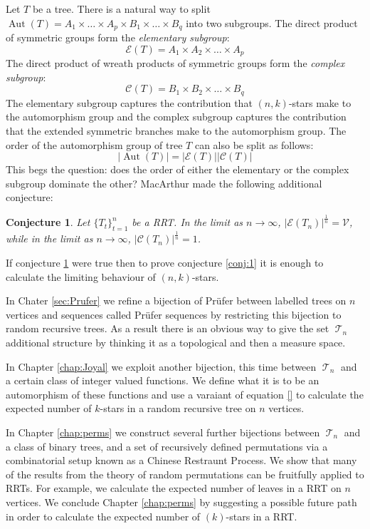 \documentclass[oneside]{book} %
\newtheorem{con}[thm]{Conjecture}
\theoremstyle{definition}
\numberwithin{equation}{section}
\DeclareMathOperator{\Aut}{Aut} %
\DeclareMathOperator{\T}{\mathcal{T}}
\begin{document}
Let $T$ be a tree.  There is a natural way to split $\Aut(T)= A_{1} \times\dots\times A_{p} \times B_{1} \times \dots \times B_{q}$ into two subgroups.  The direct product of symmetric groups form the \emph{elementary subgroup}:
\[
 \mathcal{E}(T) = A_{1} \times A_2 \times \dots\times A_{p}
\]
The direct product of wreath products of symmetric groups form the \emph{complex subgroup}:
\[
 \mathcal{C}(T) =  B_{1} \times B_2 \times \dots \times B_{q}
\]
The elementary subgroup captures the contribution that $(n,k)$-stars make to the automorphism group and the complex subgroup captures the contribution that the extended symmetric branches make to the automorphism group.  The order of the automorphism group of tree $T$ can also be split as follows:
\[
\lvert \Aut(T) \rvert  =  \lvert \mathcal{E}(T) \rvert\lvert \mathcal{C}(T)\rvert 
\]
This begs the question: does the order of either the elementary or the complex subgroup dominate the other?  MacArthur \cite{Bens} made the following additional conjecture:
\begin{con}\label{conj:2}
 Let $\{T_t\}_{t=1}^{n}$ be a RRT. In the limit as $n \rightarrow \infty$, $\lvert \mathcal{E}(T_n)\rvert^{\frac{1}{n}}  = \mathcal{V}$, while in the limit as $n \rightarrow \infty$, $\lvert \mathcal{C}(T_n)\rvert^{\frac{1}{n}}  = 1$.
 
 \end{con}
If conjecture \ref{conj:2} were true then to prove conjecture \ref{conj:1} it is enough to calculate the limiting behaviour of $(n,k)$-stars.  

In Chater \ref{sec:Prufer} we refine a bijection of Pr\"{u}fer between labelled trees on $n$ vertices and sequences called Pr\"{u}fer
 sequences by restricting this bijection to random recursive trees.  As a result there is an obvious way to give the set $\T_n$ 
 additional structure by thinking it as a topological and then a measure space.
 
In Chapter \ref{chap:Joyal} we exploit another bijection, this time between $\T_n$ and a certain class of integer valued 
functions.  We define what it is to be an automorphism of these functions and use a varaiant of equation \ref{} to calculate the 
expected number of $k$-stars in a random recursive tree on $n$ vertices.

In Chapter \ref{chap:perms} we construct several further bijections between $\T_n$ and a class of binary trees, and a set of 
recursively defined permutations via a combinatorial setup known as a Chinese Restraunt Process.  We show that many of the results 
from the theory of random permutations can be fruitfully applied to RRTs.  For example, we calculate the expected number of leaves in
a RRT on $n$ vertices. We conclude Chapter \ref{chap:perms} by suggesting a possible future path in order to calculate the
expected number of $(k)$-stars in a RRT. 
\end{document}
